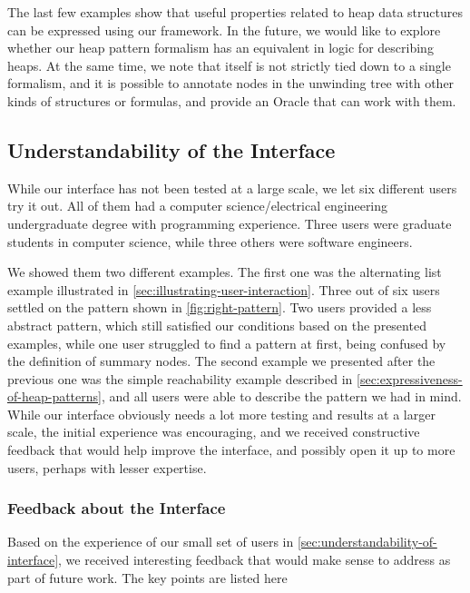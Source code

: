 The last few examples show that useful properties related to heap data structures can be
expressed using our framework. In the future, we would like to explore whether our heap
pattern formalism has an equivalent in logic for describing heaps. At the same time, we
note that \verifier itself is not strictly tied down to a single formalism, and it is
possible to annotate nodes in the unwinding tree with other kinds of structures or
formulas, and provide an Oracle that can work with them.

\subsection{Understandability of the Interface}
\label{sec:understandability-of-interface}
While our interface has not been tested at a large scale, we let six different users try
it out. All of them had a computer science/electrical engineering undergraduate degree
with programming experience. Three users were graduate students in computer science,
while three others were software engineers.

We showed them two different examples. The first one was the alternating list example
illustrated in \autoref{sec:illustrating-user-interaction}. Three out of six users settled
on the pattern shown in \autoref{fig:right-pattern}. Two users provided a less abstract
pattern, which still satisfied our conditions based on the presented examples, while one
user struggled to find a pattern at first, being confused by the definition of summary
nodes. The second example we presented after the previous one was the simple reachability
example described in \autoref{sec:expressiveness-of-heap-patterns}, and all users were
able to describe the pattern we had in mind. While our interface obviously needs a lot
more testing and results at a larger scale, the initial experience was encouraging, and
we received constructive feedback that would help improve the interface, and possibly
open it up to more users, perhaps with lesser expertise.

\subsubsection{Feedback about the Interface}
Based on the experience of our small set of users in
\autoref{sec:understandability-of-interface}, we received interesting feedback that
would make sense to address as part of future work. The key points are listed here

